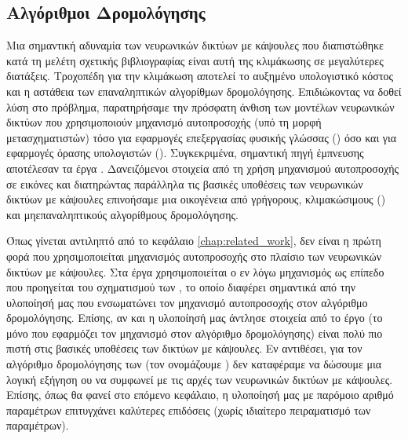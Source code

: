 \subsection{Αλγόριθμοι Δρομολόγησης}

Μια σημαντική αδυναμία των νευρωνικών δικτύων με κάψουλες που διαπιστώθηκε κατά τη μελέτη σχετικής βιβλιογραφίας είναι αυτή της κλιμάκωσης σε μεγαλύτερες διατάξεις. Τροχοπέδη για την κλιμάκωση αποτελεί το αυξημένο υπολογιστικό κόστος και η αστάθεια των επαναληπτικών αλγορίθμων δρομολόγησης. Επιδιώκοντας να δοθεί λύση στο πρόβλημα, παρατηρήσαμε την πρόσφατη άνθιση των μοντέλων νευρωνικών δικτύων που χρησιμοποιούν μηχανισμό αυτο\textendash προσοχής (υπό τη μορφή μετασχηματιστών) τόσο για εφαρμογές επεξεργασίας φυσικής γλώσσας () όσο και για εφαρμογές όρασης υπολογιστών (). Συγκεκριμένα,  σημαντική πηγή έμπνευσης αποτέλεσαν τα έργα \cite{dosovitskiy2020image_is_worth_16, carion2020end}. Δανειζόμενοι στοιχεία από τη χρήση μηχανισμού αυτο\textendash προσοχής σε εικόνες και διατηρώντας παράλληλα τις βασικές υποθέσεις των νευρωνικών δικτύων με κάψουλες επινοήσαμε μια οικογένεια από γρήγορους, κλιμακώσιμους () και μη\textendash επαναληπτικούς αλγορίθμους δρομολόγησης.\par

Όπως γίνεται αντιληπτό από το κεφάλαιο \ref{chap:related_work}, δεν είναι η πρώτη φορά που χρησιμοποιείται μηχανισμός αυτο\textendash προσοχής στο πλαίσιο των νευρωνικών δικτύων με κάψουλες. Στα έργα \cite{hoogi2019self, huang2020capsnet} χρησιμοποιείται ο εν λόγω μηχανισμός ως επίπεδο που προηγείται του σχηματισμού των , το οποίο διαφέρει σημαντικά από την υλοποίησή μας που ενσωματώνει τον μηχανισμό αυτο\textendash προσοχής στον αλγόριθμο δρομολόγησης. Επίσης, αν και η υλοποίησή μας άντλησε στοιχεία από το έργο \cite{mazzia2021efficient} (το μόνο που εφαρμόζει τον μηχανισμό στον αλγόριθμο δρομολόγησης) είναι πολύ πιο πιστή στις βασικές υποθέσεις των δικτύων με κάψουλες. Εν αντιθέσει, για τον αλγόριθμο δρομολόγησης των  (τον ονομάζουμε ) δεν καταφέραμε να δώσουμε μια λογική εξήγηση ου να συμφωνεί με τις αρχές των νευρωνικών δικτύων με κάψουλες. Επίσης, όπως θα φανεί στο επόμενο κεφάλαιο, η υλοποίησή μας με παρόμοιο αριθμό παραμέτρων επιτυγχάνει καλύτερες επιδόσεις (χωρίς ιδιαίτερο πειραματισμό των παραμέτρων).\par

